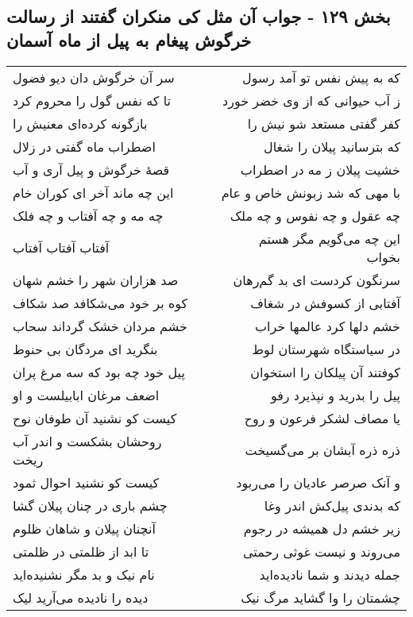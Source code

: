 \begin{center}
\section*{بخش ۱۲۹ - جواب آن مثل کی منکران گفتند از رسالت خرگوش پیغام به پیل از ماه آسمان}
\label{sec:sh129}
\begin{longtable}{l p{0.5cm} r}
سر آن خرگوش دان دیو فضول
&&
که به پیش نفس تو آمد رسول
\\
تا که نفس گول را محروم کرد
&&
ز آب حیوانی که از وی خضر خورد
\\
بازگونه کرده‌ای معنیش را
&&
کفر گفتی مستعد شو نیش را
\\
اضطراب ماه گفتی در زلال
&&
که بترسانید پیلان را شغال
\\
قصهٔ خرگوش و پیل آری و آب
&&
خشیت پیلان ز مه در اضطراب
\\
این چه ماند آخر ای کوران خام
&&
با مهی که شد زبونش خاص و عام
\\
چه مه و چه آفتاب و چه فلک
&&
چه عقول و چه نفوس و چه ملک
\\
آفتاب آفتاب آفتاب
&&
این چه می‌گویم مگر هستم بخواب
\\
صد هزاران شهر را خشم شهان
&&
سرنگون کردست ای بد گم‌رهان
\\
کوه بر خود می‌شکافد صد شکاف
&&
آفتابی از کسوفش در شغاف
\\
خشم مردان خشک گرداند سحاب
&&
خشم دلها کرد عالمها خراب
\\
بنگرید ای مردگان بی حنوط
&&
در سیاستگاه شهرستان لوط
\\
پیل خود چه بود که سه مرغ پران
&&
کوفتند آن پیلکان را استخوان
\\
اضعف مرغان ابابیلست و او
&&
پیل را بدرید و نپذیرد رفو
\\
کیست کو نشنید آن طوفان نوح
&&
یا مصاف لشکر فرعون و روح
\\
روحشان بشکست و اندر آب ریخت
&&
ذره ذره آبشان بر می‌گسیخت
\\
کیست کو نشنید احوال ثمود
&&
و آنک صرصر عادیان را می‌ربود
\\
چشم باری در چنان پیلان گشا
&&
که بدندی پیل‌کش اندر وغا
\\
آنچنان پیلان و شاهان ظلوم
&&
زیر خشم دل همیشه در رجوم
\\
تا ابد از ظلمتی در ظلمتی
&&
می‌روند و نیست غوثی رحمتی
\\
نام نیک و بد مگر نشنیده‌اید
&&
جمله دیدند و شما نادیده‌اید
\\
دیده را نادیده می‌آرید لیک
&&
چشمتان را وا گشاید مرگ نیک
\\

\end{longtable}
\end{center}
